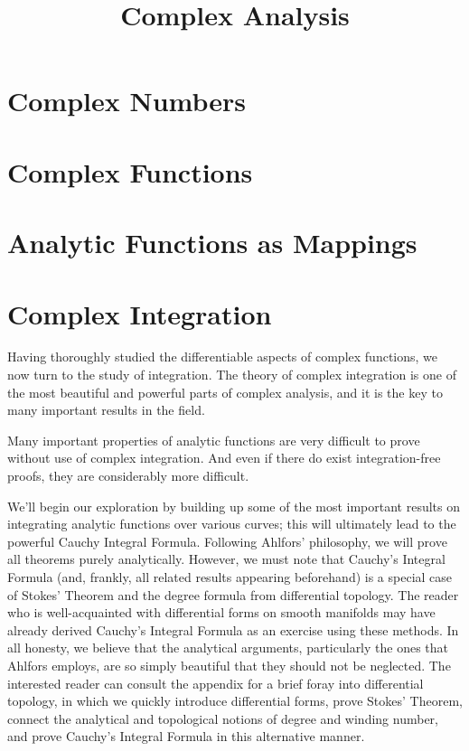 \documentclass[12pt, twoside=semi,openright,numbers=noenddot,titlepage=false]{scrbook}
\title{Complex Analysis}
\begin{document}
\frontmatter
\maketitle



\mainmatter

\tableofcontents

\part{Complex Numbers}


\part{Complex Functions}



\part{Analytic Functions as Mappings}




\part{Complex Integration}
Having thoroughly studied the differentiable aspects of complex functions, we now turn to the study of integration. The theory of complex integration is one of the most beautiful and powerful parts of complex analysis, and it is the key to many important results in the field.

Many important properties of analytic functions are very difficult to prove without use of complex integration. And even if there do exist integration-free proofs, they are considerably more difficult.

We'll begin our exploration by building up some of the most important results on integrating analytic functions over various curves; this will ultimately lead to the powerful Cauchy Integral Formula. Following Ahlfors' philosophy, we will prove all theorems purely analytically. However, we must note that Cauchy's Integral Formula (and, frankly, all related results appearing beforehand) is a special case of Stokes' Theorem and the degree formula from differential topology. The reader who is well-acquainted with differential forms on smooth manifolds may have already derived Cauchy's Integral Formula as an exercise using these methods. In all honesty, we believe that the analytical arguments, particularly the ones that Ahlfors employs, are so simply beautiful that they should not be neglected. The interested reader can consult the appendix for a brief foray into differential topology, in which we quickly introduce differential forms, prove Stokes' Theorem, connect the analytical and topological notions of degree and winding number, and prove Cauchy's Integral Formula in this alternative manner.



\end{document}
